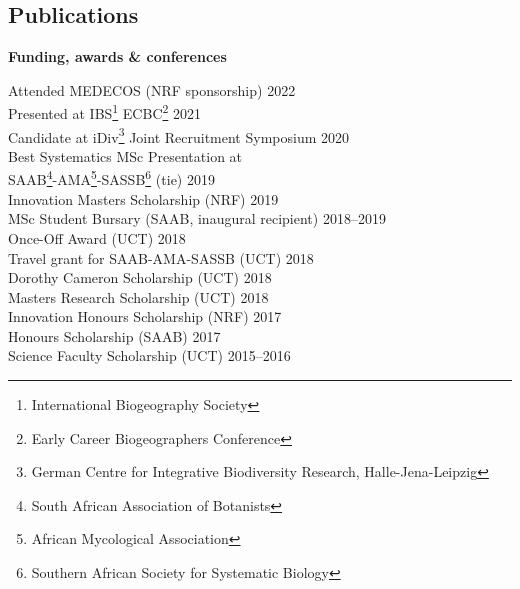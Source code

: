 \documentclass[10pt]{article}
\begin{document}


\bigskip



\subsection*{Publications} %



\hrulefill

\begin{multicols}{2} %

\textbf{Funding, awards \& conferences} %

Attended MEDECOS {\small (NRF sponsorship)}        \hfill {\small       2022} \\
Presented at IBS\footnote{International
  Biogeography Society} ECBC\footnote{Early Career
  Biogeographers Conference}                       \hfill {\small       2021} \\
Candidate at iDiv\footnote{German Centre for
  Integrative Biodiversity Research,
  Halle-Jena-Leipzig} Joint Recruitment Symposium  \hfill {\small       2020} \\
Best Systematics MSc Presentation at                                          \\
\hspace{2em} SAAB\footnote{South African
  Association of Botanists}-AMA\footnote{African
  Mycological Association}-SASSB\footnote{Southern
  African Society for Systematic Biology}
                                   {\small  (tie)} \hfill {\small       2019} \\
Innovation Masters Scholarship     {\small  (NRF)} \hfill {\small       2019} \\
MSc Student Bursary                {\small (SAAB,
                                       inaugural 
                                       recipient)} \hfill {\small 2018--2019} \\
Once-Off Award                     {\small  (UCT)} \hfill {\small       2018} \\
Travel grant for SAAB-AMA-SASSB    {\small  (UCT)} \hfill {\small       2018} \\
Dorothy Cameron Scholarship        {\small  (UCT)} \hfill {\small       2018} \\
Masters Research Scholarship       {\small  (UCT)} \hfill {\small       2018} \\
Innovation Honours Scholarship     {\small  (NRF)} \hfill {\small       2017} \\
Honours Scholarship                {\small (SAAB)} \hfill {\small       2017} \\
Science Faculty Scholarship        {\small  (UCT)} \hfill {\small 2015--2016}


\end{multicols}
\end{document}
